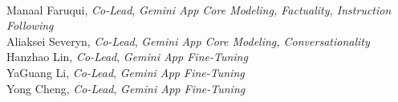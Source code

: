 \begin{minipage}[t]{0.50\linewidth}
\noindent
\\
Manaal Faruqui, \textit{Co-Lead}, \textit{Gemini App Core Modeling, Factuality, Instruction Following} \\
Aliaksei Severyn, \textit{Co-Lead}, \textit{Gemini App Core Modeling, Conversationality} \\
Hanzhao Lin, \textit{Co-Lead}, \textit{Gemini App Fine-Tuning} \\
YaGuang Li, \textit{Co-Lead}, \textit{Gemini App Fine-Tuning} \\
Yong Cheng, \textit{Co-Lead}, \textit{Gemini App Fine-Tuning} \\

\end{minipage}
